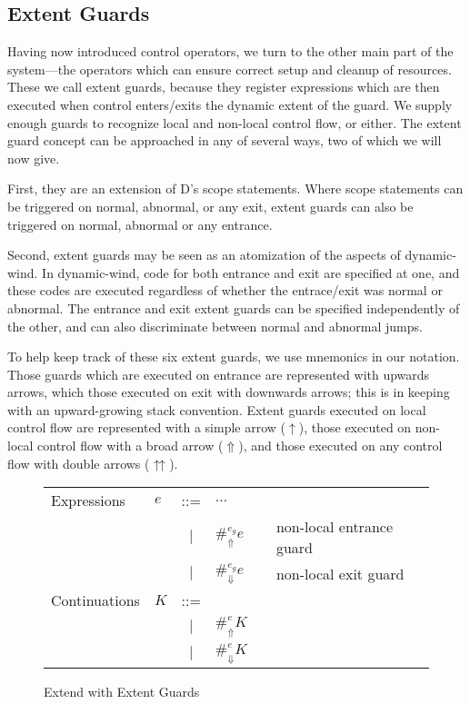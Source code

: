 \documentclass[11pt]{article}
\newcommand{\maybePage}{\newpage}
\begin{document}
\maybePage
\subsection{Extent Guards}
\label{subsec:extentGuards}

Having now introduced control operators, we turn to the other main part of the system---the operators which can ensure correct setup and cleanup of resources.
These we call extent guards, because they register expressions which are then executed when control enters/exits the dynamic extent of the guard.
We supply enough guards to recognize local and non-local control flow, or either.
The extent guard concept can be approached in any of several ways, two of which we will now give.

First, they are an extension of D's scope statements.
Where scope statements can be triggered on normal, abnormal, or any exit, extent guards can also be triggered on normal, abnormal or any entrance.

Second, extent guards may be seen as an atomization of the aspects of dynamic-wind.
In dynamic-wind, code for both entrance and exit are specified at one, and these codes are executed regardless of whether the entrace/exit was normal or abnormal.
The entrance and exit extent guards can be specified independently of the other, and can also discriminate between normal and abnormal jumps.

To help keep track of these six extent guards, we use mnemonics in our notation.
Those guards which are executed on entrance are represented with upwards arrows, which those executed on exit with downwards arrows; this is in keeping with an upward-growing stack convention.
Extent guards executed on local control flow are represented with a simple arrow ($\uparrow$), those executed on non-local control flow with a broad arrow ($\Uparrow$), and those executed on any control flow with double arrows ($\upuparrows$).

\begin{figure}[H]
\caption{Extend with Extent Guards}
\label{fig:addGuards}

\begin{tabular}{llclll}
Expressions & $e$ & ::= & $\ldots$ &  \\
& & $|$ & $\#_\Uparrow^{e_g}e$ && non-local entrance guard \\
& & $|$ & $\#_\Downarrow^{e_g}e$ && non-local exit guard \\
Continuations & $K$ & ::= & \\
& & $|$ & $\#_{\Uparrow}^{e}K$ &&  \\
& & $|$ & $\#_{\Downarrow}^{e}K$ &&  \\
\end{tabular}
\end{figure}
\end{document}
